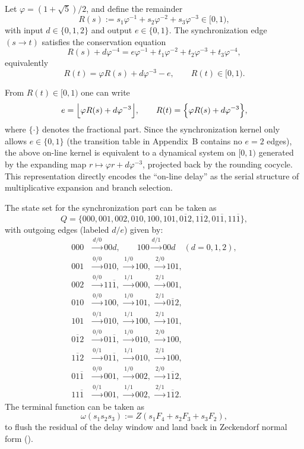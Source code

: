 Let $\varphi=(1+\sqrt5)/2$, and define the remainder
\[
R(s):=s_1\varphi^{-1}+s_2\varphi^{-2}+s_3\varphi^{-3}\in[0,1),
\]
with input $d\in\{0,1,2\}$ and output $e\in\{0,1\}$. The synchronization edge $(s\to t)$ satisfies the conservation equation
\[
R(s)+d\varphi^{-4}=e\varphi^{-1}+t_1\varphi^{-2}+t_2\varphi^{-3}+t_3\varphi^{-4},
\]
equivalently
\[
R(t)=\varphi R(s)+d\varphi^{-3}-e,\qquad R(t)\in[0,1).
\]
\begin{remark}
From $R(t)\in[0,1)$ one can write
\[
e=\Bigl\lfloor \varphi R(s)+d\varphi^{-3}\Bigr\rfloor,\qquad
R(t)=\Bigl\{\varphi R(s)+d\varphi^{-3}\Bigr\},
\]
where $\{\cdot\}$ denotes the fractional part. Since the synchronization kernel only allows $e\in\{0,1\}$ (the transition table in Appendix~B contains no $e=2$ edges), the above on-line kernel is equivalent to a dynamical system on $[0,1)$ generated by the expanding map $r\mapsto \varphi r+d\varphi^{-3}$, projected back by the rounding cocycle. This representation directly encodes the ``on-line delay'' as the serial structure of multiplicative expansion and branch selection.
\end{remark}
The state set for the synchronization part can be taken as
\[
Q=\{000,001,002,010,100,101,0\overline{1}2,1\overline{1}2,01\overline{1},11\overline{1}\},
\]
with outgoing edges (labeled $d/e$) given by:
\[
\begin{aligned}
000&\xrightarrow{d/0}00d,\qquad 100\xrightarrow{d/1}00d\quad(d=0,1,2),\\
001&\xrightarrow{0/0}010,\ \xrightarrow{1/0}100,\ \xrightarrow{2/0}101,\\
002&\xrightarrow{0/0}11\overline{1},\ \xrightarrow{1/1}000,\ \xrightarrow{2/1}001,\\
010&\xrightarrow{0/0}100,\ \xrightarrow{1/0}101,\ \xrightarrow{2/1}0\overline{1}2,\\
101&\xrightarrow{0/1}010,\ \xrightarrow{1/1}100,\ \xrightarrow{2/1}101,\\
0\overline{1}2&\xrightarrow{0/0}01\overline{1},\ \xrightarrow{1/0}010,\ \xrightarrow{2/0}100,\\
1\overline{1}2&\xrightarrow{0/1}01\overline{1},\ \xrightarrow{1/1}010,\ \xrightarrow{2/1}100,\\
01\overline{1}&\xrightarrow{0/0}001,\ \xrightarrow{1/0}002,\ \xrightarrow{2/0}1\overline{1}2,\\
11\overline{1}&\xrightarrow{0/1}001,\ \xrightarrow{1/1}002,\ \xrightarrow{2/1}1\overline{1}2.
\end{aligned}
\]
The terminal function can be taken as
\[
\omega(s_1s_2s_3):=Z(s_1F_4+s_2F_3+s_3F_2),
\]
to flush the residual of the delay window and land back in Zeckendorf normal form (\cite{Frougny1999OnlineAddition}).

